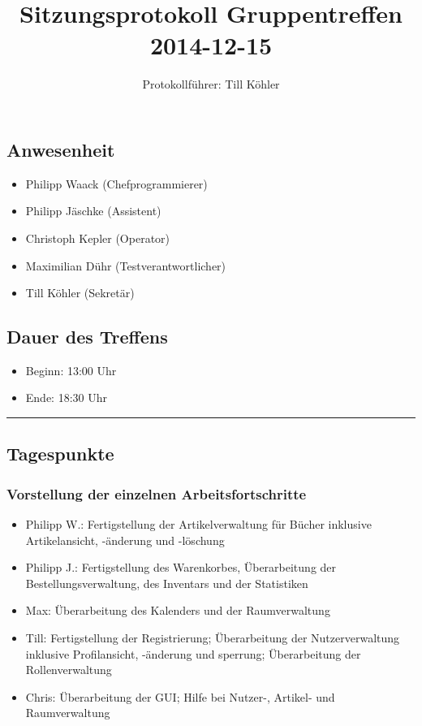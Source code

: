 \documentclass[12pt,a4paper]{article}
\author{Protokollführer: Till Köhler}
\title{Sitzungsprotokoll Gruppentreffen 2014-12-15}
\date{}
\begin{document}
\maketitle

\subsection*{Anwesenheit}
\medskip
\begin{itemize}
\item Philipp Waack (Chefprogrammierer)
\item Philipp Jäschke (Assistent)
\item Christoph Kepler (Operator)
\item Maximilian Dühr (Testverantwortlicher)
\item Till Köhler (Sekretär)
\end{itemize}

\subsection*{Dauer des Treffens}
\medskip
\begin{itemize}
\item Beginn: 13:00 Uhr
\item Ende: 18:30 Uhr
\end{itemize}

\noindent\rule{\textwidth}{1pt}

\subsection*{Tagespunkte}
\medskip

\subsubsection*{Vorstellung der einzelnen Arbeitsfortschritte}
\begin{itemize}
\item Philipp W.: Fertigstellung der Artikelverwaltung für Bücher inklusive Artikelansicht, -änderung und -löschung
\item Philipp J.: Fertigstellung des Warenkorbes, Überarbeitung der Bestellungsverwaltung, des Inventars und der Statistiken
\item Max: Überarbeitung des Kalenders und der Raumverwaltung
\item Till: Fertigstellung der Registrierung; Überarbeitung der Nutzerverwaltung inklusive Profilansicht, -änderung und sperrung; Überarbeitung der Rollenverwaltung
\item Chris: Überarbeitung der GUI; Hilfe bei Nutzer-, Artikel- und Raumverwaltung
\end{itemize}
\end{document}
